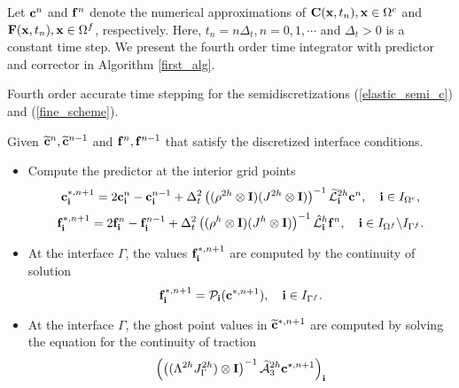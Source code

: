 Let ${\bf c}^{n}$ and ${\bf f}^{n}$ denote the numerical approximations of ${\bf C}({\bf x},t_n), {\bf x}\in\Omega^c$ and ${\bf F}({\bf x},t_n), {\bf x}\in\Omega^f$, respectively. Here, $t_n = n\Delta_t, n = 0,1,\cdots$ and $\Delta_t > 0$ is a constant time step. We present the fourth order time integrator with predictor and corrector in  Algorithm \ref{first_alg}.
~\\
\begin{breakablealgorithm}
	\caption{Fourth order accurate time stepping for the semidiscretizations  (\ref{elastic_semi_c}) and  (\ref{fine_scheme}). }\label{first_alg}
	Given $\widetilde{{\bf c}}^{n}, \widetilde{{\bf c}}^{n-1}$ and ${\bf f}^{n}, {\bf f}^{n-1}$ that satisfy the discretized interface conditions.
	
	\begin{itemize}
		\item  {Compute the predictor at the interior grid points %
			\[{\bf c}^{*,n+1}_{\bf i} = 2{\bf c}^{n}_{\bf i} - {\bf c}^{n-1}_{\bf i} + \Delta_t^2\left((\rho^{2h}\otimes{\bf I})(J^{2h}\otimes{\bf I})\right)^{-1}{\widetilde{\mathcal{L}}}^{2h}_{\bf i} {\bf{c}}^{n},\quad {\bf i}\in I_{\Omega^c},\]
			\[{\bf f}^{*,n+1}_{\bf i} = 2{\bf f}^{n}_{\bf i} - {\bf f}^{n-1}_{\bf i} + \Delta_t^2\left((\rho^{h}\otimes{\bf I})(J^{h}\otimes{\bf I})\right)^{-1}\hat{\mathcal{L}}^{h}_{\bf i} {\bf{f}}^{n},\quad {\bf i}\in I_{\Omega^f}\backslash I_{\Gamma^f}.\]
		}
		\item{At the interface $\Gamma$, the values ${\bf f}^{*,n+1}_{\bf i}$  are computed by the continuity of solution 
			\begin{equation*}
			{\bf f}^{*,n+1}_{\bf i} = {\mathcal{P}}_{\bf i}({\bf c}^{*,n+1}),\quad {\bf i}\in I_{\Gamma^f}.
			\end{equation*}
		}
		\item{At the interface $\Gamma$, the ghost point values in $\widetilde{\bf c}^{*,n+1}$ are computed by solving the equation for the continuity of traction 
				\begin{equation}\label{traction_gamma_pre}
			\left(\left((\Lambda^{2h}J^{2h}_{\Gamma})\otimes{\bf I}\right)^{-1}\wt{\mathcal{A}}_3^{2h}{\bf c}^{\star,n+1}\right)_{\bf i}

\end{equation}}
\end{itemize}
\end{breakablealgorithm}
